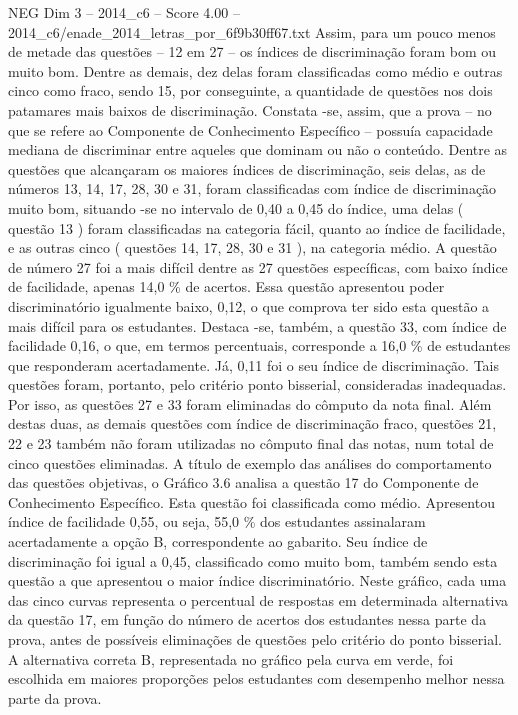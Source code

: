 \begin{textsample}{NEG Dim 3 – 2014\_c6 – Score 4.00 – 2014\_c6/enade\_2014\_letras\_por\_6f9b30ff67.txt}
Assim, para um pouco menos de metade das questões – 12 em 27 – os índices de discriminação foram bom ou muito bom.
Dentre as demais, dez delas foram classificadas como médio e outras cinco como fraco, sendo 15, por conseguinte, a quantidade de questões nos dois patamares mais baixos de discriminação.
Constata -se, assim, que a prova – no que se refere ao Componente de Conhecimento Específico – possuía capacidade mediana de discriminar entre aqueles que dominam ou não o conteúdo.
Dentre as questões que alcançaram os maiores índices de discriminação, seis delas, as de números 13, 14, 17, 28, 30 e 31, foram classificadas com índice de discriminação muito bom, situando -se no intervalo de 0,40 a 0,45 do índice, uma delas ( questão 13 ) foram classificadas na categoria fácil, quanto ao índice de facilidade, e as outras cinco ( questões 14, 17, 28, 30 e 31 ), na categoria médio.
A questão de número 27 foi a mais difícil dentre as 27 questões específicas, com baixo índice de facilidade, apenas 14,0 \% de acertos.
Essa questão apresentou poder discriminatório igualmente baixo, 0,12, o que comprova ter sido esta questão a mais difícil para os estudantes.
Destaca -se, também, a questão 33, com índice de facilidade 0,16, o que, em termos percentuais, corresponde a 16,0 \% de estudantes que responderam acertadamente.
Já, 0,11 foi o seu índice de discriminação.
Tais questões foram, portanto, pelo critério ponto bisserial, consideradas inadequadas.
Por isso, as questões 27 e 33 foram eliminadas do cômputo da nota final.
Além destas duas, as demais questões com índice de discriminação fraco, questões 21, 22 e 23 também não foram utilizadas no cômputo final das notas, num total de cinco questões eliminadas.
A título de exemplo das análises do comportamento das questões objetivas, o Gráfico 3.6 analisa a questão 17 do Componente de Conhecimento Específico.
Esta questão foi classificada como médio.
Apresentou índice de facilidade 0,55, ou seja, 55,0 \% dos estudantes assinalaram acertadamente a opção B, correspondente ao gabarito.
Seu índice de discriminação foi igual a 0,45, classificado como muito bom, também sendo esta questão a que apresentou o maior índice discriminatório.
Neste gráfico, cada uma das cinco curvas representa o percentual de respostas em determinada alternativa da questão 17, em função do número de acertos dos estudantes nessa parte da prova, antes de possíveis eliminações de questões pelo critério do ponto bisserial.
A alternativa correta B, representada no gráfico pela curva em verde, foi escolhida em maiores proporções pelos estudantes com desempenho melhor nessa parte da prova.

\end{textsample}
